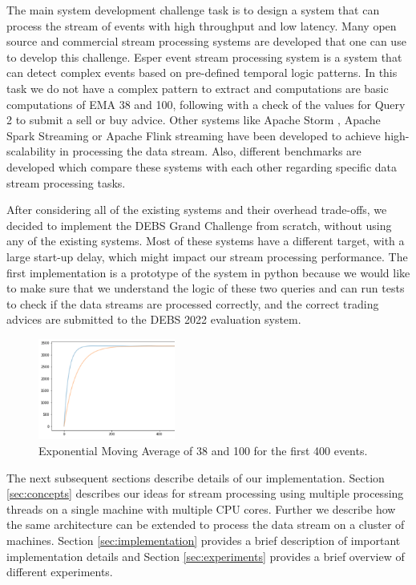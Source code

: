 The main system development challenge task is to design a system that can process the stream of events with high throughput and low latency.
Many open source and commercial stream processing systems are developed that one can use to develop this challenge.
Esper event stream processing system \cite{Bernhardt2007} is a system that can detect complex events based on pre-defined temporal logic patterns.
In this task we do not have a complex pattern to extract and computations are basic computations of EMA 38 and 100, following with a check of the values for
Query 2 to submit a sell or buy advice. Other systems like Apache Storm \cite{8288619}, Apache Spark Streaming \cite{zaharia2010spark} or
Apache Flink streaming \cite{alexandrov2014stratosphere} have been developed to achieve high-scalability in processing the data stream.
Also, different benchmarks are developed \cite{8701904} which compare these systems with each other regarding specific data
stream processing tasks.

After considering all of the existing systems and their overhead trade-offs, we decided to implement the DEBS Grand Challenge from scratch,
without using any of the existing systems. Most of these systems have a different target, with a large start-up delay, which might impact
our stream processing performance. The first implementation is a prototype of the system in python because we would like to make sure
that we understand the logic of these two queries and can run tests to check if the data streams are processed correctly, and the correct
trading advices are submitted to the DEBS 2022 evaluation system. 



\begin{figure}[!ht]
    \begin{center}
        \includegraphics[width=0.4\textwidth]{./images/query2_example_200.png}
        \caption{Exponential Moving Average of 38 and 100 for the first 400 events.}
        \label{fig:EMA200}
    \end{center}
\end{figure}


The next subsequent sections describe details of our implementation. Section \ref{sec:concepts} describes our ideas for
stream processing using multiple processing threads on a single machine with multiple CPU cores. Further we describe how the same
architecture can be extended to process the data stream on a cluster of machines.  Section \ref{sec:implementation} provides
a brief description of important implementation details and Section \ref{sec:experiments} provides a brief overview of different
experiments.
